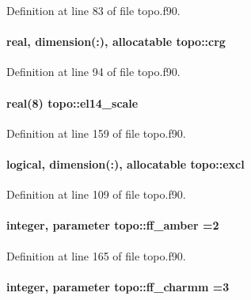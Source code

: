 Definition at line 83 of file topo.\-f90.

\hypertarget{classtopo_a19aa89f2c73146419d066f95e7d789b4}{
\paragraph[{crg}]{\setlength{\rightskip}{0pt plus 5cm}real, dimension(\-:), allocatable topo\-::crg}}\label{classtopo_a19aa89f2c73146419d066f95e7d789b4}


Definition at line 94 of file topo.\-f90.

\hypertarget{classtopo_aceb0d764eb03b4b14e013f791b20210c}{
\paragraph[{el14\-\_\-scale}]{\setlength{\rightskip}{0pt plus 5cm}real(8) topo\-::el14\-\_\-scale}}\label{classtopo_aceb0d764eb03b4b14e013f791b20210c}


Definition at line 159 of file topo.\-f90.

\hypertarget{classtopo_a9ef86d62501c5cd833dee346e02d324c}{
\paragraph[{excl}]{\setlength{\rightskip}{0pt plus 5cm}logical, dimension(\-:), allocatable topo\-::excl}}\label{classtopo_a9ef86d62501c5cd833dee346e02d324c}


Definition at line 109 of file topo.\-f90.

\hypertarget{classtopo_a8e1182655496f5acb43690d5141e48cd}{
\paragraph[{ff\-\_\-amber}]{\setlength{\rightskip}{0pt plus 5cm}integer, parameter topo\-::ff\-\_\-amber =2}}\label{classtopo_a8e1182655496f5acb43690d5141e48cd}


Definition at line 165 of file topo.\-f90.

\hypertarget{classtopo_a0f190a378d94253fd8ba43557193bbc7}{
\paragraph[{ff\-\_\-charmm}]{\setlength{\rightskip}{0pt plus 5cm}integer, parameter topo\-::ff\-\_\-charmm =3}}\label{classtopo_a0f190a378d94253fd8ba43557193bbc7}


